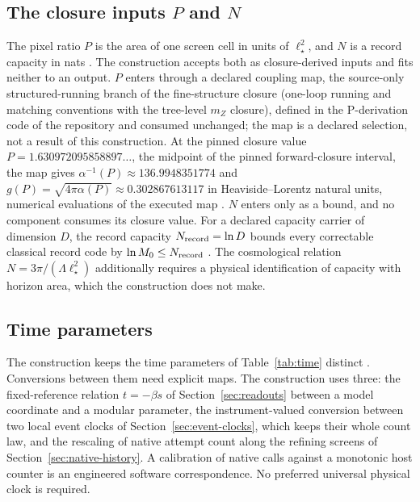 \documentclass[11pt]{article}
\theoremstyle{definition}
\theoremstyle{remark}
\theoremstyle{plain}
\begin{document}
\subsection{The closure inputs \texorpdfstring{$P$}{P} and \texorpdfstring{$N$}{N}}
\label{sec:closure-inputs}

The pixel ratio $P$ is the area of one screen cell in units of
$\ell_\star^2$, and $N$ is a record capacity in nats
\cite{ophobservers,pACCESS}. The construction accepts both as closure-derived
inputs and fits neither to an output. $P$ enters through a declared coupling map, the source-only structured-running branch of the fine-structure closure (one-loop running and matching conventions with the tree-level $m_Z$ closure), defined in the P-derivation code of the repository \cite{ophrepo} and consumed unchanged; the map is a declared selection, not a result of this construction. At the pinned closure value $P=1.630972095858897\ldots$, the midpoint of the pinned forward-closure interval, the map gives $\alpha^{-1}(P)\approx136.9948351774$ and $g(P)=\sqrt{4\pi\alpha(P)}\approx0.302867613117$ in Heaviside--Lorentz natural units, numerical evaluations of the executed map \cite{pREADME,rP}. $N$ enters only as a bound, and no component consumes its closure value. For a declared capacity carrier of dimension $D$, the record capacity $N_{\rm record}=\ln D$ bounds every correctable classical record code by $\ln M_0\le N_{\rm record}$ \cite{mCONSTRUCTION,oCAP}. The
cosmological relation $N=3\pi/(\Lambda\ell_\star^2)$ additionally requires a
physical identification of capacity with horizon area, which the
construction does not make.

\subsection{Time parameters}
\label{sec:time}

The construction keeps the time parameters of Table~\ref{tab:time} distinct
\cite{mINTERP}. Conversions between them need explicit maps. The
construction uses three: the fixed-reference relation $t=-\beta s$ of
Section~\ref{sec:readouts} between a model coordinate and a modular
parameter, the instrument-valued conversion between two local event clocks
of Section~\ref{sec:event-clocks}, which keeps their whole count law, and
the rescaling of native attempt count along the refining screens of
Section~\ref{sec:native-history}. A calibration of native calls against a
monotonic host counter is an engineered software correspondence. No
preferred universal physical clock is required.
\end{document}
